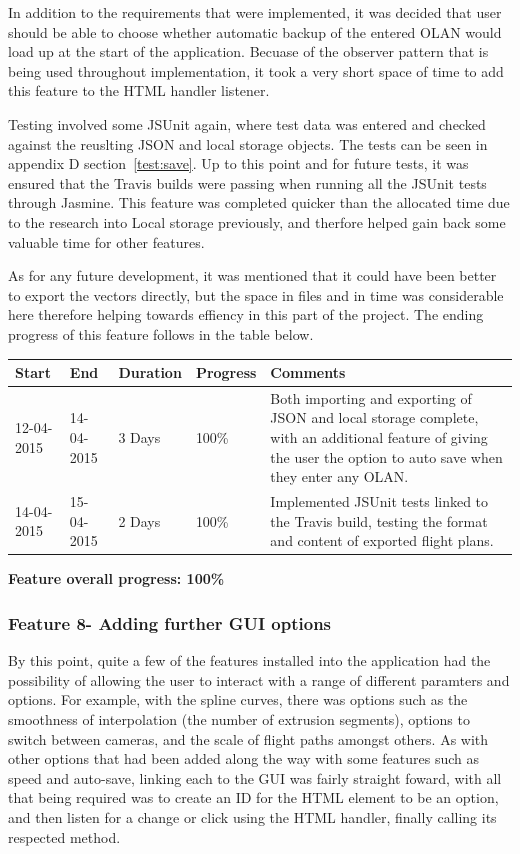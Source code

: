 In addition to the requirements that were implemented, it was decided that user should be able to choose whether automatic backup of the entered OLAN would load up at the start of the application. Becuase of the observer pattern that is being used throughout implementation, it took a very short space of time to add this feature to the HTML handler listener.

Testing involved some JSUnit again, where test data was entered and checked against the reuslting JSON and local storage objects. The tests can be seen in appendix D section~\ref{test:save}. Up to this point and for future tests, it was ensured that the Travis builds were passing when running all the JSUnit tests through Jasmine. This feature was completed quicker than the allocated time due to the research into Local storage previously, and therfore helped gain back some valuable time for other features.

As for any future development, it was mentioned that it could have been better to export the vectors directly, but the space in files and in time was considerable here therefore helping towards effiency in this part of the project. The ending progress of this feature follows in the table below.

\begin{table}[h]
\begin{tabular}{|l|l|l|l|p{7cm}|}
\hline
\textbf{Start} & \textbf{End} & \textbf{Duration} & \textbf{Progress} & \textbf{Comments}                                                                                                     \\ \hline
12-04-2015     & 14-04-2015   & 3 Days            & 100\%             &  Both importing and exporting of JSON and local storage complete, with an additional feature of giving the user the option to auto save when they enter any OLAN.\\ \hline
14-04-2015     & 15-04-2015   & 2 Days            & 100\%             &  Implemented JSUnit tests linked to the Travis build, testing the format and content of exported flight plans.\\ \hline
\end{tabular}
\end{table}

\textbf{Feature overall progress: 100\%}

\subsubsection{Feature 8- Adding further GUI options}
By this point, quite a few of the features installed into the application had the possibility of allowing the user to interact with a range of different paramters and options. For example, with the spline curves, there was options such as the smoothness of interpolation (the number of extrusion segments), options to switch between cameras, and the scale of flight paths amongst others. As with other options that had been added along the way with some features such as speed and auto-save, linking each to the GUI was fairly straight foward, with all that being required was to create an ID for the HTML element to be an option, and then listen for a change or click using the HTML handler, finally calling its respected method.  


